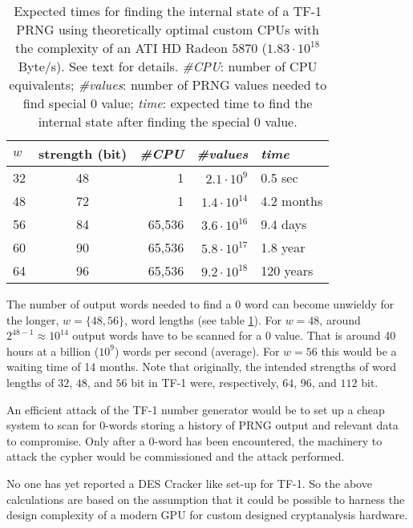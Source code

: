 \documentclass{article}
\begin{document}
\begin{table}[b]
\begin{center}
\caption{Expected times for finding the internal state of a TF-1 PRNG \cite{tsaban:0507063} 
using theoretically optimal custom CPUs with the complexity of an ATI HD Radeon 5870 
($1.83 \cdot 10^{18}$ Byte/s). See text for details.\newline
\textit{\#CPU}: number of CPU equivalents; \textit{\#values}: number of PRNG values needed to find special 0 value;
\textit{time}: expected time to find the internal state after finding the special 0 value.}
\begin{tabular}{lcrrl}
$w$ & strength (bit) & \textit{\#CPU} & \textit{\#values} & \textit{time} \\
\hline
32 & 48 & 1 & $2.1\cdot 10^9$ & 0.5 sec \\
48 & 72 & 1 & $1.4 \cdot 10^{14}$& 4.2 months \\
56 & 84 & 65,536 & $3.6 \cdot 10^{16}$ & 9.4 days \\
60 & 90 & 65,536 & $5.8 \cdot  10^{17}$ & 1.8 year \\
64 & 96 & 65,536 & $9.2 \cdot 10^{18}$ & 120 years \\
\end{tabular}
\label{TabTF-1}
\end{center}
\end{table}


The number of
output words needed to find a $0$ word can become unwieldy for the longer,
 $w = \{48, 56\}$, word lengths (see table \ref{TabTF-1}). For $w=48$, around 
 $2^{48-1}\approx 10^{14}$ output words have to be scanned for a 0 value. 
 That is around 40 hours at a billion ($10^9$) words per second (average). 
 For $w=56$ this would be a waiting time of 14 months. 
Note that originally, the intended strengths of
word lengths of $32$, $48$, and $56$ bit in TF-1 were, respectively, 
$64$, $96$, and $112$ bit.

An efficient attack of the TF-1 number generator would be to set up a cheap system to 
scan for 0-words storing a history of PRNG output and relevant data to compromise. 
Only after a 0-word has been encountered, the machinery to attack the cypher would be 
commissioned and the attack performed.  

No one has yet reported a DES Cracker like set-up for TF-1. So the above
calculations are based on the assumption that it could be possible to harness
the design complexity of a modern GPU for custom designed cryptanalysis
hardware.
\end{document}
